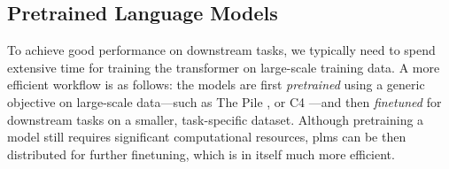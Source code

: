 {\subsection{Pretrained Language Models}
\label{sec:plms}
To achieve good performance on downstream tasks, we typically need to spend extensive time for training the transformer on large-scale training data. A more efficient workflow is as follows: the models are first \emph{pretrained} using a generic objective on large-scale data---such as The Pile \cite{gao2020pile}, or C4 \cite{raffelExploringLimitsTransfer2019}---and then \emph{finetuned} for downstream tasks on a smaller, task-specific dataset. Although pretraining a model still requires significant computational resources, \acp{plm} can be then distributed for further finetuning, which is in itself much more efficient.


}
